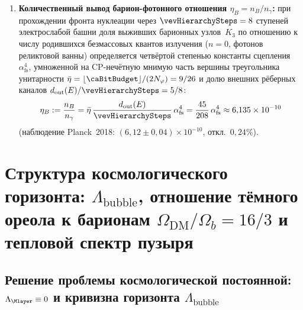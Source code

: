 \begin{theorem}
\begin{enumerate}[leftmargin=*]
\begin{equation}
  \end{equation}
  Прямое численное интегрирование обратимого шага~$g$ на трёхмерной решётке~\latGCKshort\ с начальным вектором $\mathrm{IV} = 263$ из состояния без посаженных вихрей ($b(\tau=0) \equiv 0$) детерминированно рождает устойчивые вихревые солитоны материи ($b = 1$) с чистым положительным топологическим зарядом $\sum n > 0$, тогда как инверсия старшего бита ($\mathrm{IV} = 7$, $b_{\mathrm{chir}} = 0$) зеркально меняет знак рождающегося мира на антиматерию ($\sum n < 0$).
\item \textbf{Количественный вывод барион-фотонного отношения $\eta_B = n_B / n_\gamma$:}
  при прохождении фронта нуклеации через $\vevHierarchySteps = 8$ ступеней электрослабой башни доля выживших барионных узлов~$K_3$ по отношению к числу родившихся безмассовых квантов излучения ($n=0$, фотонов реликтовой ванны) определяется четвёртой степенью константы сцепления~$\alpha_{\mathrm{fs}}^4$, умноженной на CP-нечётную мнимую часть вершины треугольника унитарности $\bar\eta = \lfloor\caBitBudget\rfloor / (2N_\varphi) = 9/26$ и долю внешних рёберных каналов $d_{\mathrm{out}}(E)/\vevHierarchySteps = 5/8$:
  \begin{equation}
  \label{eq:cosmo-baryon-to-photon}
    \eta_B := \frac{n_B}{n_\gamma}
    = \bar\eta\,\frac{d_{\mathrm{out}}(E)}{\vevHierarchySteps}\,\alpha_{\mathrm{fs}}^4
    = \frac{45}{208}\,\alpha_{\mathrm{fs}}^4
    \approx 6{,}135\times 10^{-10}
  \end{equation}
  (наблюдение Planck~2018: $(6{,}12 \pm 0{,}04)\times 10^{-10}$, откл.~$0{,}24\%$).
\end{enumerate}
\end{theorem}

\chapter{Структура космологического горизонта: \texorpdfstring{$\Lambda_{\mathrm{bubble}}$}{Lambda}, отношение тёмного ореола к барионам \texorpdfstring{$\Omega_{\mathrm{DM}}/\Omega_b = 16/3$}{16/3} и тепловой спектр пузыря}
\label{ch:cosmo-horizon-dm-cmb}

\section{Решение проблемы космологической постоянной: \texorpdfstring{$\Lambda_{\Mlayer} \equiv 0$}{Lambda\_M = 0} и кривизна горизонта \texorpdfstring{$\Lambda_{\mathrm{bubble}}$}{Lambda\_bubble}}
\label{sec:cosmo-lambda-solution}

